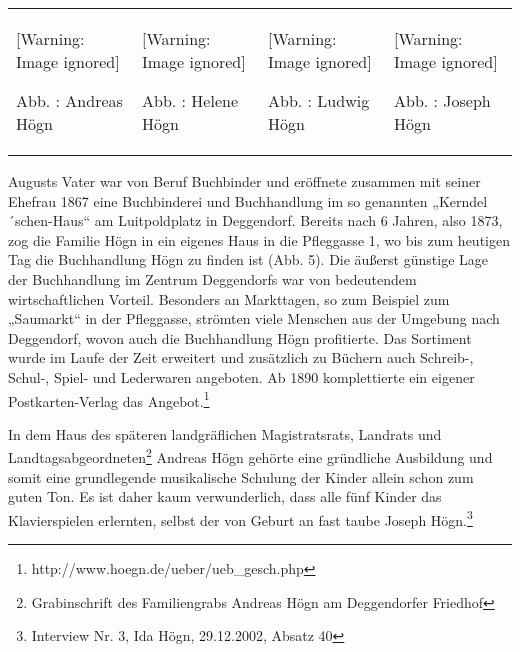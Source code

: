 \documentclass[a4paper]{article}
\newcounter{Abb}
\renewcommand\theAbb{\arabic{Abb}}
\begin{document}
\begin{flushleft}
\tablefirsthead{}
\tablehead{}
\tabletail{}
\tablelasttail{}
\begin{supertabular}{m{3.462cm}m{4.1130004cm}m{3.3309999cm}m{3.4919999cm}}
  [Warning: Image ignored] %
 
Abb. \stepcounter{Abb}{\theAbb}: Andreas Högn &
  [Warning: Image ignored] %
 
Abb. \stepcounter{Abb}{\theAbb}: Helene Högn &
  [Warning: Image ignored] %
 
Abb. \stepcounter{Abb}{\theAbb}: Ludwig Högn &
  [Warning: Image ignored] %
 
Abb. \stepcounter{Abb}{\theAbb}: Joseph Högn\\
\end{supertabular}
\end{flushleft}
Augusts Vater war von Beruf Buchbinder und eröffnete zusammen mit seiner
Ehefrau 1867 eine Buchbinderei und Buchhandlung im so genannten
„Kerndel´schen-Haus“ am Luitpoldplatz in Deggendorf. Bereits nach 6
Jahren, also 1873, zog die Familie Högn in ein eigenes Haus in die
Pfleggasse 1, wo bis zum heutigen Tag die Buchhandlung Högn zu finden
ist (Abb. 5). Die äußerst günstige Lage der Buchhandlung im Zentrum
Deggendorfs war von bedeutendem wirtschaftlichen Vorteil. Besonders an
Markttagen, so zum Beispiel zum „Saumarkt“ in der Pfleggasse, strömten
viele Menschen aus der Umgebung nach Deggendorf, wovon auch die
Buchhandlung Högn profitierte. Das Sortiment wurde im Laufe der Zeit
erweitert und zusätzlich zu Büchern auch Schreib-, Schul-, Spiel- und
Lederwaren angeboten. Ab 1890 komplettierte ein eigener
Postkarten-Verlag das Angebot.\footnote{
http://www.hoegn.de/ueber/ueb\_gesch.php} 

In dem Haus des späteren landgräflichen Magistratsrats, Landrats und
Landtagsabgeordneten\footnote{ Grabinschrift des Familiengrabs Andreas
Högn am Deggendorfer Friedhof} Andreas Högn gehörte eine gründliche
Ausbildung und somit eine grundlegende musikalische Schulung der Kinder
allein schon zum guten Ton. Es ist daher kaum verwunderlich, dass alle
fünf Kinder das Klavierspielen erlernten, selbst der von Geburt an fast
taube Joseph Högn.\footnote{ Interview Nr. 3, Ida Högn, 29.12.2002,
Absatz 40}
\end{document}
